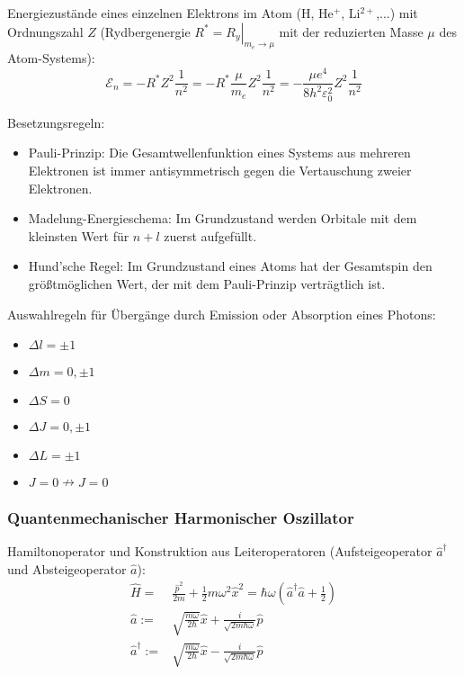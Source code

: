 			\noindent
			Energiezustände eines einzelnen Elektrons im Atom ($\mathrm{H}$, $\mathrm{He^{+}}$, $\mathrm{Li^{2+}}$,...) mit Ordnungszahl $Z$ (Rydbergenergie $\left.R^*=R_y\right|_{m_e\rightarrow \mu}$ mit der reduzierten Masse $\mu$ des Atom-Systems):
			\begin{equation}
				\mathcal{E}_n = -R^* Z^2 \frac{1}{n^2} = -R^* \frac{\mu}{m_e} Z^2 \frac{1}{n^2} = - \frac{\mu e^4}{8 h^2 \varepsilon_0^2} Z^2 \frac{1}{n^2}
			\end{equation}

			\noindent
			Besetzungsregeln:
			\begin{itemize}
				\item Pauli-Prinzip: Die Gesamtwellenfunktion eines Systems aus mehreren Elektronen ist immer antisymmetrisch	gegen die Vertauschung zweier Elektronen.
				\item Madelung-Energieschema: Im Grundzustand werden Orbitale mit dem kleinsten Wert für $n+l$ zuerst aufgefüllt.
				\item Hund'sche Regel: Im Grundzustand eines Atoms hat der Gesamtspin den größtmöglichen Wert, der mit dem Pauli-Prinzip verträgtlich ist.
			\end{itemize}

			\noindent
			Auswahlregeln für Übergänge durch Emission oder Absorption eines Photons:
			\begin{itemize}
				\item $\Delta l = \pm 1$
				\item $\Delta m = 0, \pm 1$
				\item $\Delta S = 0$
				\item $\Delta J = 0, \pm 1$
				\item $\Delta L = \pm 1$
				\item $J=0 \nrightarrow J=0$
			\end{itemize}

		\subsubsection{Quantenmechanischer Harmonischer Oszillator}
			\noindent
			Hamiltonoperator und Konstruktion aus Leiteroperatoren (Aufsteigeoperator $\hat{a}^\dagger$ und Absteigeoperator $\hat{a}$):
			\begin{equation}
				\begin{aligned}
					\hat{H} =& \frac{\hat{p}^2}{2m} + \frac{1}{2}m\omega^2 \hat{x}^2 = \hbar\omega(\hat{a}^\dagger \hat{a} + \frac{1}{2}) \\
					\hat{a} :=& \sqrt{\frac{m\omega}{2\hbar}}\hat{x} + \frac{i}{\sqrt{2m\hbar\omega}}\hat{p} \\
					\hat{a}^\dagger :=& \sqrt{\frac{m\omega}{2\hbar}}\hat{x} - \frac{i}{\sqrt{2m\hbar\omega}}\hat{p} \\
				\end{aligned}
			\end{equation}

